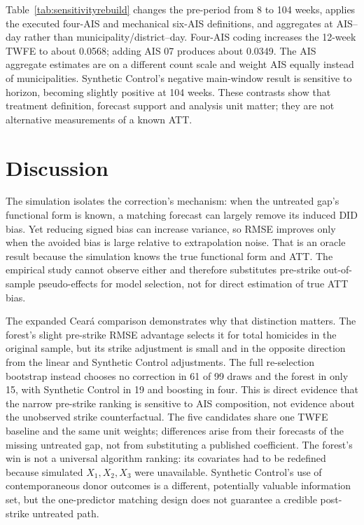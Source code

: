 

Table~\ref{tab:sensitivityrebuild} changes the pre-period from 8 to 104 weeks, applies the executed four-AIS and mechanical six-AIS definitions, and aggregates at AIS--day rather than municipality/district--day. Four-AIS coding increases the 12-week TWFE to about 0.0568; adding AIS 07 produces about 0.0349. The AIS aggregate estimates are on a different count scale and weight AIS equally instead of municipalities. Synthetic Control's negative main-window result is sensitive to horizon, becoming slightly positive at 104 weeks. These contrasts show that treatment definition, forecast support and analysis unit matter; they are not alternative measurements of a known ATT.



{\footnotesize}

\section{Discussion}\label{sec:discussion}
The simulation isolates the correction's mechanism: when the untreated gap's functional form is known, a matching forecast can largely remove its induced DID bias. Yet reducing signed bias can increase variance, so RMSE improves only when the avoided bias is large relative to extrapolation noise. That is an oracle result because the simulation knows the true functional form and ATT. The empirical study cannot observe either and therefore substitutes pre-strike out-of-sample pseudo-effects for model selection, not for direct estimation of true ATT bias.

The expanded Cear\'a comparison demonstrates why that distinction matters. The forest's slight pre-strike RMSE advantage selects it for total homicides in the original sample, but its strike adjustment is small and in the opposite direction from the linear and Synthetic Control adjustments. The full re-selection bootstrap instead chooses no correction in 61 of 99 draws and the forest in only 15, with Synthetic Control in 19 and boosting in four. This is direct evidence that the narrow pre-strike ranking is sensitive to AIS composition, not evidence about the unobserved strike counterfactual. The five candidates share one TWFE baseline and the same unit weights; differences arise from their forecasts of the missing untreated gap, not from substituting a published coefficient. The forest's win is not a universal algorithm ranking: its covariates had to be redefined because simulated $X_1,X_2,X_3$ were unavailable. Synthetic Control's use of contemporaneous donor outcomes is a different, potentially valuable information set, but the one-predictor matching design does not guarantee a credible post-strike untreated path.


